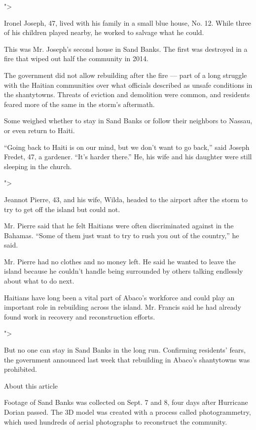 "\textgreater{}

Ironel Joseph, 47, lived with his family in a small blue house, No. 12.
While three of his children played nearby, he worked to salvage what he
could.

This was Mr. Joseph's second house in Sand Banks. The first was
destroyed in a fire that wiped out half the community in 2014.

The government did not allow rebuilding after the fire --- part of a
long struggle with the Haitian communities over what officials described
as unsafe conditions in the shantytowns. Threats of eviction and
demolition were common, and residents feared more of the same in the
storm's aftermath.

Some weighed whether to stay in Sand Banks or follow their neighbors to
Nassau, or even return to Haiti.

``Going back to Haiti is on our mind, but we don't want to go back,''
said Joseph Fredet, 47, a gardener. ``It's harder there.'' He, his wife
and his daughter were still sleeping in the church.

"\textgreater{}

Jeannot Pierre, 43, and his wife, Wilda, headed to the airport after the
storm to try to get off the island but could not.

Mr. Pierre said that he felt Haitians were often discriminated against
in the Bahamas. ``Some of them just want to try to rush you out of the
country,'' he said.

Mr. Pierre had no clothes and no money left. He said he wanted to leave
the island because he couldn't handle being surrounded by others talking
endlessly about what to do next.

Haitians have long been a vital part of Abaco's workforce and could play
an important role in rebuilding across the island. Mr. Francis said he
had already found work in recovery and reconstruction efforts.

"\textgreater{}

But no one can stay in Sand Banks in the long run. Confirming residents'
fears, the government announced last week that rebuilding in Abaco's
shantytowns was prohibited.

About this article

Footage of Sand Banks was collected on Sept. 7 and 8, four days after
Hurricane Dorian passed. The 3D model was created with a process called
photogrammetry, which used hundreds of aerial photographs to reconstruct
the community.

